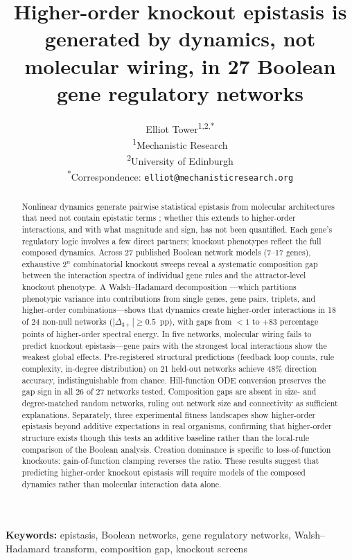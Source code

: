 \documentclass[10pt]{article}
\title{Higher-order knockout epistasis is generated by dynamics, not molecular wiring, in 27 Boolean gene regulatory networks}
\author{
  Elliot Tower\textsuperscript{1,2,*} \\[4pt]
  \small\textsuperscript{1}Mechanistic Research \\
  \small\textsuperscript{2}University of Edinburgh \\
  \small\textsuperscript{*}Correspondence: \texttt{elliot@mechanisticresearch.org}
}
\begin{document}
\maketitle
\linenumbers
\doublespacing

\begin{abstract}
Nonlinear dynamics generate pairwise statistical epistasis from
molecular architectures that need not contain epistatic terms
\citep{gjuvsland2007statistical}; whether this extends to
higher-order interactions, and with what magnitude and sign, has not
been quantified. Each gene's regulatory logic involves a few direct
partners; knockout phenotypes reflect the full composed dynamics.
Across 27 published Boolean network models (7--17 genes), exhaustive
$2^n$ combinatorial knockout sweeps reveal a systematic composition
gap between the interaction spectra of individual gene rules and the
attractor-level knockout phenotype. A Walsh--Hadamard decomposition
---which partitions phenotypic variance into contributions from
single genes, gene pairs, triplets, and higher-order
combinations---shows that dynamics create higher-order interactions
in 18 of 24 non-null networks ($|\Delta_{3+}| \geq 0.5$~pp), with
gaps from $< 1$ to $+83$ percentage points of higher-order spectral
energy. In five networks, molecular wiring fails to predict knockout
epistasis---gene pairs with the strongest local interactions show the
weakest global effects. Pre-registered structural predictions
(feedback loop counts, rule complexity, in-degree distribution) on 21
held-out networks achieve 48\% direction accuracy, indistinguishable
from chance. Hill-function ODE conversion preserves the gap sign in
all 26 of 27 networks tested. Composition gaps are absent in size- and
degree-matched random networks, ruling out network size and
connectivity as sufficient explanations. Separately, three experimental
fitness
landscapes show higher-order epistasis beyond additive expectations
in real organisms, confirming that higher-order structure exists
though this tests an additive baseline rather than the local-rule
comparison of the Boolean analysis. Creation dominance is specific to
loss-of-function knockouts: gain-of-function clamping reverses the
ratio. These results suggest that predicting higher-order knockout
epistasis will require models of the composed dynamics rather than
molecular interaction data alone.
\end{abstract}

\noindent\textbf{Keywords:}
epistasis, Boolean networks, gene regulatory networks,
Walsh--Hadamard transform, composition gap, knockout screens
\end{document}
